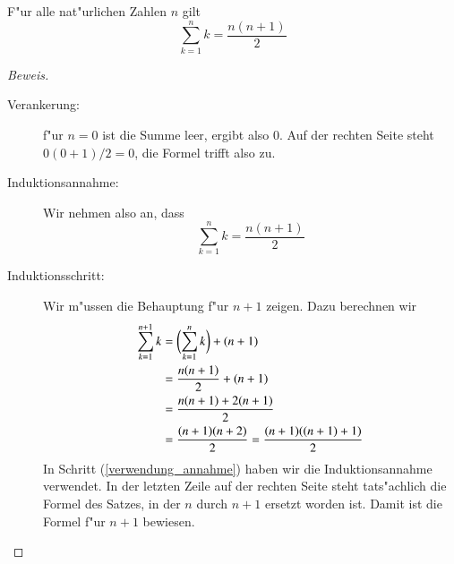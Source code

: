 \begin{satz} F"ur alle nat"urlichen Zahlen $n$ gilt
\[
\sum_{k=1}^nk=\frac{n(n+1)}2
\]
\end{satz}
\begin{proof}[Beweis]
\begin{description}
\item[Verankerung:] f"ur $n=0$ ist die Summe leer, ergibt also $0$.
Auf der rechten Seite steht $0(0+1)/2=0$, die Formel trifft also zu.
\item[Induktionsannahme:]Wir nehmen also an, dass
\[
\sum_{k=1}^nk=\frac{n(n+1)}2
\]
\item[Induktionsschritt:] Wir m"ussen die Behauptung f"ur $n+1$ zeigen. Dazu
berechnen wir
\begin{align}
\sum_{k=1}^{n+1}k&=\biggl(\sum_{k=1}^nk\biggr) + (n+1)\notag\\
&=\frac{n(n+1)}2+(n+1)\label{verwendung_annahme}\\
&=\frac{n(n+1)+2(n+1)}2\notag\\
&=\frac{(n+1)(n+2)}2=\frac{(n+1)((n+1)+1)}2\notag
\end{align}
In Schritt (\ref{verwendung_annahme}) haben wir die Induktionsannahme
verwendet. In der letzten Zeile auf der rechten Seite steht tats"achlich
die Formel des Satzes, in der $n$ durch $n+1$ ersetzt worden ist.
Damit ist die Formel f"ur $n+1$ bewiesen.
\end{description}
\end{proof}
